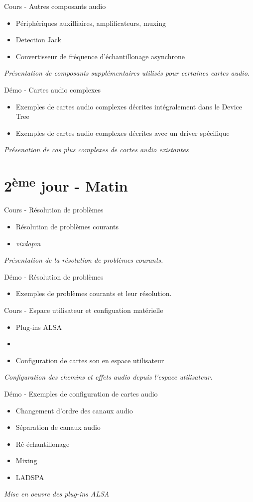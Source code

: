 \documentclass[a4paper,12pt,obeyspaces,spaces,hyphens]{article}
\begin{document}
\feagendatwocolumn
{Cours - Autres composants audio}
{
  \begin{itemize}
  \item Périphériques auxilliaires, amplificateurs, muxing
  \item Detection Jack
  \item Convertisseur de fréquence d'échantillonage asynchrone
  \end{itemize}
  \vspace{0.5em}
  {\em Présentation de composants supplémentaires utilisés pour certaines cartes audio.}
}
{Démo - Cartes audio complexes}
{
  \begin{itemize}
  \item Exemples de cartes audio complexes décrites intégralement dans le Device Tree
  \item Exemples de cartes audio complexes décrites avec un driver spécifique
  \end{itemize}
  \vspace{0.5em}
  {\em Présenation de cas plus complexes de cartes audio existantes}
}

\section{2\textsuperscript{ème} jour - Matin}

\feagendatwocolumn
{Cours - Résolution de problèmes}
{
  \begin{itemize}
  \item Résolution de problèmes courants
  \item {\em vizdapm}
  \end{itemize}
  \vspace{0.5em}
  {\em Présentation de la résolution de problèmes courants.}
}
{Démo - Résolution de problèmes}
{
  \begin{itemize}
  \item Exemples de problèmes courants et leur résolution.
  \end{itemize}
}

\feagendatwocolumn
{Cours - Espace utilisateur et configuation matérielle}
{
  \begin{itemize}
  \item Plug-ins ALSA
  \item {}
  \item Configuration de cartes son en espace utilisateur
  \end{itemize}
  \vspace{0.5em}
  {\em Configuration des chemins et effets audio depuis l'espace utilisateur.}
}
{Démo - Exemples de configuration de cartes audio}
{
  \begin{itemize}
  \item Changement d'ordre des canaux audio
  \item Séparation de canaux audio
  \item Ré-échantillonage
  \item Mixing
  \item LADSPA
  \end{itemize}
  \vspace{0.5em}
  {\em Mise en oeuvre des plug-ins ALSA}
}
\end{document}
